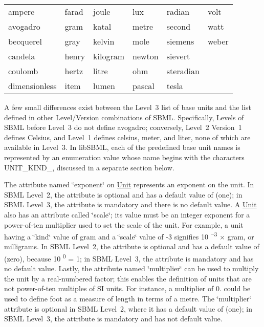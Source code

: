 \begin{DoxyParagraph}{}
\tabulinesep=1mm
\begin{longtabu} spread 0pt [c]{*{6}{|X[-1]}|}
\hline
ampere&farad&joule&lux&radian&volt  \\
avogadro&gram&katal&metre&second&watt  \\
becquerel&gray&kelvin&mole&siemens&weber  \\
candela&henry&kilogram&newton&sievert  \\
coulomb&hertz&litre&ohm&steradian  \\
dimensionless&item&lumen&pascal&tesla  \\
\end{longtabu}

\end{DoxyParagraph}
A few small differences exist between the Level~3 list of base units and the list defined in other Level/\+Version combinations of S\+B\+ML. Specifically, Levels of S\+B\+ML before Level~3 do not define {\ttfamily avogadro}; conversely, Level~2 Version~1 defines {\ttfamily Celsius}, and Level~1 defines {\ttfamily celsius}, {\ttfamily meter}, and {\ttfamily liter}, none of which are available in Level~3. In lib\+S\+B\+ML, each of the predefined base unit names is represented by an enumeration value whose name begins with the characters {\ttfamily U\+N\+I\+T\+\_\+\+K\+I\+N\+D\+\_\+}, discussed in a separate section below.

The attribute named \char`\"{}exponent\char`\"{} on \hyperlink{class_unit}{Unit} represents an exponent on the unit. In S\+B\+ML Level~2, the attribute is optional and has a default value of {} (one); in S\+B\+ML Level~3, the attribute is mandatory and there is no default value. A \hyperlink{class_unit}{Unit} also has an attribute called \char`\"{}scale\char`\"{}; its value must be an integer exponent for a power-\/of-\/ten multiplier used to set the scale of the unit. For example, a unit having a \char`\"{}kind\char`\"{} value of {\ttfamily gram} and a \char`\"{}scale\char`\"{} value of {\ttfamily -\/3} signifies 10\textsuperscript{~--3} $\times$ gram, or milligrams. In S\+B\+ML Level~2, the attribute is optional and has a default value of {} (zero), because 10\textsuperscript{ 0} = 1; in S\+B\+ML Level~3, the attribute is mandatory and has no default value. Lastly, the attribute named \char`\"{}multiplier\char`\"{} can be used to multiply the unit by a real-\/numbered factor; this enables the definition of units that are not power-\/of-\/ten multiples of SI units. For instance, a multiplier of 0. could be used to define {\ttfamily foot} as a measure of length in terms of a {\ttfamily metre}. The \char`\"{}multiplier\char`\"{} attribute is optional in S\+B\+ML Level~2, where it has a default value of {} (one); in S\+B\+ML Level~3, the attribute is mandatory and has not default value.

